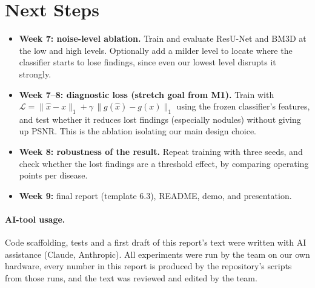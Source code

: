 \documentclass[11pt]{article}
\begin{document}
\section{Next Steps}
\label{sec:next}
\begin{itemize}[leftmargin=*]
  \item \textbf{Week 7: noise-level ablation.} Train and evaluate ResU-Net and BM3D at the low and high levels. Optionally add a milder level to locate where the classifier starts to lose findings, since even our lowest level disrupts it strongly.
  \item \textbf{Week 7--8: diagnostic loss (stretch goal from M1).} Train with $\mathcal{L}=\|\hat{x}-x\|_1+\gamma\,\|g(\hat{x})-g(x)\|_1$ using the frozen classifier's features, and test whether it reduces lost findings (especially nodules) without giving up PSNR. This is the ablation isolating our main design choice.
  \item \textbf{Week 8: robustness of the result.} Repeat training with three seeds, and check whether the lost findings are a threshold effect, by comparing operating points per disease.
  \item \textbf{Week 9:} final report (template 6.3), README, demo, and presentation.
\end{itemize}

\paragraph{AI-tool usage.} Code scaffolding, tests and a first draft of this report's text were written with AI assistance (Claude, Anthropic). All experiments were run by the team on our own hardware, every number in this report is produced by the repository's scripts from those runs, and the text was reviewed and edited by the team.



\end{document}
